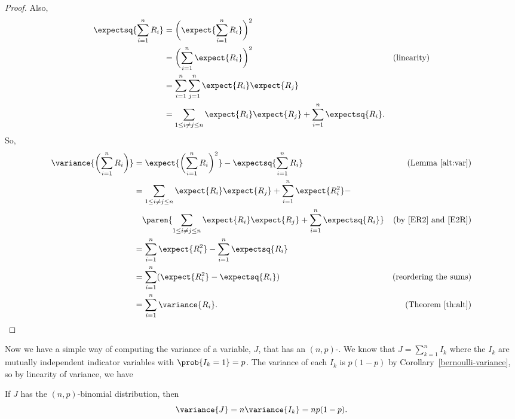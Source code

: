 \begin{editingnotes}
\begin{proof}
Also,
\begin{align}
\expectsq{\sum_{i=1}^n R_i} & = \biggl(\expect{\sum_{i=1}^n R_i}\biggr)^2 \notag\\
  &  = \biggl(\sum_{i=1}^n \expect{R_i}\biggr)^2 &\text{(linearity)} \notag\\
  &  = \sum_{i=1}^n \sum_{j=1}^n \expect{R_i} \expect{R_j}\notag\\
  & = \sum_{1\le i \neq j \le n} \expect{R_i}\expect{R_j} + \sum_{i=1}^n
     \expectsq{R_i}.\label{E2R}
\end{align}
So,
\begin{align*}
\variance{\biggl(\sum_{i=1}^n R_i\biggr)}
   & =  \expect{\biggl(\sum_{i=1}^n R_i\biggr)^2} -
\expectsq{\sum_{i=1}^n R_i}  & \text{(Lemma~\ref{alt:var})}\\
   &  = \sum_{1\le i \neq j \le n} \expect{R_i} \expect{R_j}
        + \sum_{i=1}^n \expect{R_i^2} - \\
   & \quad \paren{\sum_{1\le i \neq j \le n} \expect{R_i}\expect{R_j}
        + \sum_{i=1}^n \expectsq{R_i}}
      & \text{(by~\eqref{ER2} and~\eqref{E2R})}\\
   & = \sum_{i=1}^n \expect{R_i^2} - \sum_{i=1}^n \expectsq{R_i}\\
   & = \sum_{i=1}^n (\expect{R_i^2} - \expectsq{R_i})
             & \text{(reordering the sums)}\\
   & = \sum_{i=1}^n \variance{R_i}. & \text{(Theorem~\ref{th:alt})}
\end{align*}
\fi
\end{proof}
\end{editingnotes}


Now we have a simple way of computing the variance of a variable, $J$,
that has an $(n,p)$-.  We know that $J =
\sum_{k=1}^n I_k$ where the $I_k$ are mutually independent indicator
variables with $\prob{I_k=1}=p$.  The variance of each $I_k$ is $p(1-p)$
by Corollary~\ref{bernoulli-variance}, so by linearity of variance, we have
\begin{lemma}
If $J$ has the $(n,p)$-binomial distribution, then
\begin{equation}\label{eq:binom-var}
\variance{J} = n \variance{I_k} = np(1-p).
\end{equation}
\end{lemma}

